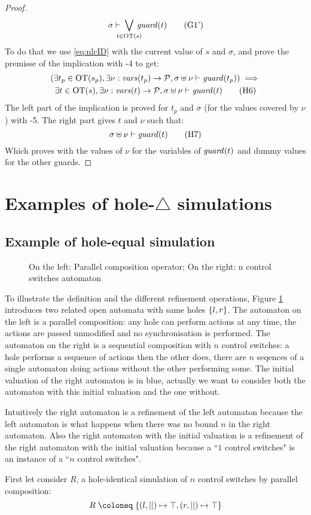 \documentclass{article}
\begin{document}
\begin{proof}
	\[ \sigma \vdash \bigvee_\subbox{t \in \fOT{s}} \fguard{t} \goal{1'} \]
	To do that we use \eqref{eq:nlcID} with the current value of \(s\) and \(\sigma\), and prove the premisse of the implication with \hyp{4} to get:
	\begin{multline}
		\mpar{\exists t_p \in \fOT{s_p}, \exists \nu: \fvars{t_p} \to \values, \sigma \uplus \nu \vdash \fguard{t_p}} \implies \\
		\exists t \in \fOT{s}, \exists \nu: \fvars{t} \to \values, \sigma \uplus \nu \vdash \fguard{t} \hyp{6}
	\end{multline}
	The left part of the implication is proved for \(t_p\) and \(\sigma\) (for the values covered by \(\nu\)) with \hyp{5}.
	The right part gives \(t\) and \(\nu\) such that:
	\[ \sigma \uplus \nu \vdash \fguard{t} \hyp{7} \]
	Which proves  with the values of \(\nu\) for the variables of \(\mathit{guard}{\left(t\right)}\) and dummy values for the other guards.
\end{proof}

\section{Examples of hole-\(\triangle\) simulations}\label{apx:refrel}
\subsection{Example of hole-equal simulation}
\begin{exi}
\begin{figure}
\centering

\vrule

\caption{On the left: Parallel composition operator; On the right: n control switches automaton}
\label{fig:hisim}
\end{figure}
To illustrate the definition and the different refinement operations, Figure \ref{fig:hisim} introduces two related open automata with same holes \({\left\{l, r\right\}}\).
The automaton on the left is a parallel composition: any hole can perform actions at any time, the actions are passed unmodified and no synchronisation is performed.
The automaton on the right is a sequential composition with \(n\) control switches: a hole performs a sequence of actions then the other does, there are \(n\) seqences of a single automaton doing actions without the other performing some.
The initial valuation of the right automaton is in blue, actually we want to consider both the automaton with this initial valuation and the one without.

Intuitively the right automaton is a refinement of the left automaton because the left automaton is what happens when there was no bound \(n\) in the right automaton.
Also the right automaton with the initial valuation is a refinement of the right automaton with the initial valuation because a ``\(1\) control switches" is an instance of a ``\(n\) control switches".

First let consider \(R\), a hole-identical simulation of \(n\) control switches by parallel composition:
\[ R \defobject \mbrc{\mpar{l, ||} \mapsto \top, \mpar{r, ||} \mapsto \top} \]
\end{exi}
\end{document}
